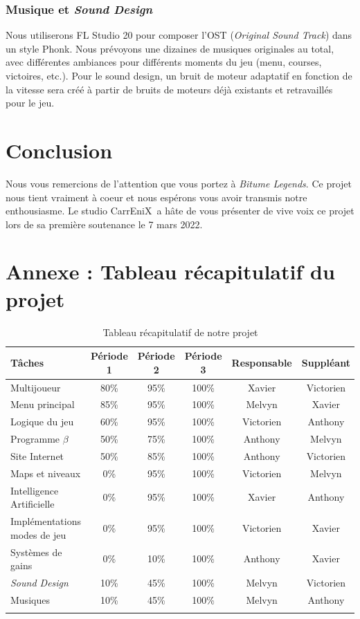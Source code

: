 \documentclass[11pt,a4paper]{article}
\newcommand{\btmlgs}{\textit{Bitume Legends}}
\newcommand{\AI}{Intelligence Artificielle}
\newcommand{\CEX}{CarrEniX}
\begin{document}
    \subsubsection{Musique et \textit{Sound Design}}
      Nous utiliserons FL Studio 20 pour composer l'OST (\textit{Original Sound Track}) dans un style Phonk.
      Nous prévoyons une dizaines de musiques originales au total, avec différentes ambiances pour
      différents moments du jeu (menu, courses, victoires, etc.). Pour le sound design, un bruit de 
      moteur adaptatif en fonction de la vitesse sera créé à partir de bruits de moteurs déjà 
      existants et retravaillés pour le jeu.
\clearpage

\section{Conclusion}
    Nous vous remercions de l'attention que vous portez à \btmlgs.
    Ce projet nous tient vraiment à coeur et nous espérons vous avoir transmis notre enthousiasme.
    Le studio \CEX\, a hâte de vous présenter de vive voix ce projet lors de sa première soutenance le 7 mars 2022.


\section{Annexe : Tableau récapitulatif du projet}
\renewcommand{\arraystretch}{1.2}
\setlength{\LTleft}{-1cm plus 1 fill}
\setlength{\LTright}{-1cm plus 1 fill}
\begin{longtable}{| p{4cm} || c | c | c | c | c |}
  \hline
  Tâches & Période 1 & Période 2 & Période 3 & Responsable & Suppléant\\\hline\hline
  Multijoueur & 80\% & 95\% & 100\% & Xavier & Victorien \\\hline
  Menu principal & 85\% & 95\% & 100\% & Melvyn & Xavier \\\hline
  Logique du jeu & 60\% & 95\%  & 100\% & Victorien & Anthony\\\hline
  Programme \(\beta\) & 50\% & 75\% & 100\% & Anthony & Melvyn \\\hline
  Site Internet & 50\% & 85\%  & 100\% & Anthony & Victorien\\\hline
  Maps et niveaux & 0\% & 95\%  & 100\% & Victorien & Melvyn\\\hline
  \AI & 0\% & 95\%  & 100\% & Xavier & Anthony\\\hline
  Implémentations modes de jeu & 0\% & 95\%  & 100\% & Victorien & Xavier\\\hline
  Systèmes de gains & 0\% & 10\%  & 100\% & Anthony & Xavier\\\hline
  \textit{Sound Design} & 10\% & 45\% & 100\% & Melvyn & Victorien\\\hline
  Musiques & 10\% & 45\%  & 100\% & Melvyn & Anthony \\\hline
  \caption{Tableau récapitulatif de notre projet}
\end{longtable}
\end{document}
